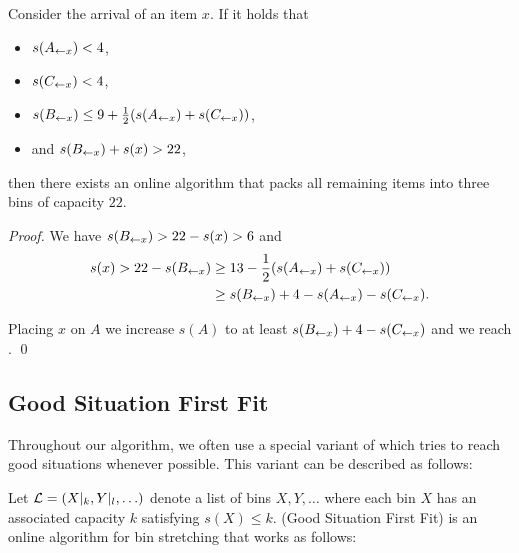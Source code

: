 \begin{goodsit}\label{lem:gs7}
Consider the arrival of an item $x$.
If it holds that
\begin{itemize}
\item $s(A_{\leftarrow x})<4$, 
\item $s(C_{\leftarrow x})<4$, %
\item $s(B_{\leftarrow x})\le 9+\frac{1}{2}(s(A_{\leftarrow x})+s(C_{\leftarrow x}))$, %
\item and $s(B_{\leftarrow x})+s(x)>22$,
\end{itemize}
then there exists an online algorithm that packs all remaining items into
three bins of capacity $22$.
\end{goodsit}

\begin{proof}
We have $s(B_{\leftarrow x}) > 22 - s(x) > 6$ and 
\begin{align*}
s(x) > 22-s(B_{\leftarrow x}) &\ge 13 - \frac{1}{2}(s(A_{\leftarrow x})+s(C_{\leftarrow x}))\\ &\ge s(B_{\leftarrow x})+4-s(A_{\leftarrow x})-s(C_{\leftarrow x}).
\end{align*}

Placing $x$ on $A$ we increase $s(A)$ to at least $s(B_{\leftarrow x})+4-s(C_{\leftarrow x})$
and we reach . %
\qed
\end{proof}


\subsection{Good Situation First Fit}\label{sec:3alg}

Throughout our algorithm, we often use a special variant of \FF\/
which tries to reach good situations whenever possible. This
variant can be described as follows:

\begin{dfn}\label{dfn:gsff}
Let ${\mathcal L}=(X|_k, Y|_l, \ldots)$ denote a list of bins $X,Y, \ldots $ where each
bin $X$ has an associated capacity $k$ satisfying $s(X)\leq k$.
\GSFF{$\calL$} (Good Situation First Fit) is an online algorithm for bin stretching that works as follows:

\vspace{1.5ex}
\end{dfn}

